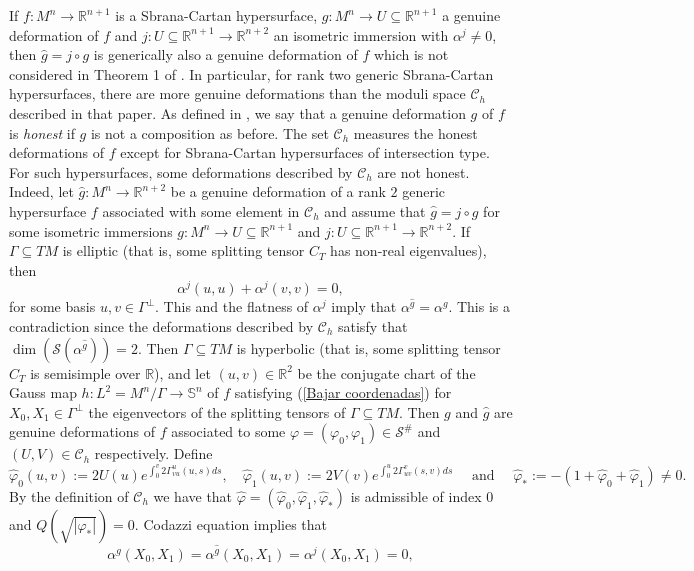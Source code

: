 \documentclass{article}
\theoremstyle{remark}
\begin{document}
If $f:M^n\rightarrow \mathbb{R}^{n+1}$ is a Sbrana-Cartan hypersurface, $g:M^n\rightarrow U\subseteq\mathbb{R}^{n+1}$ a genuine deformation of $f$ and $j:U\subseteq\mathbb{R}^{n+1}\rightarrow\mathbb{R}^{n+2}$ an isometric immersion with $\alpha^j\neq 0$, then $\hat{g}=j\circ g$ is generically also a genuine deformation of $f$ which is not considered in Theorem 1 of \cite{DFT}.
In particular, for rank two generic Sbrana-Cartan hypersurfaces, there are more genuine deformations than the moduli space $\mathcal{C}_h$ described in that paper. 
As defined in \cite{FF}, we say that a genuine deformation $g$ of $f$ is {\it honest} if $g$ is not a composition as before.
The set $\mathcal{C}_h$ measures the honest deformations of $f$ except for Sbrana-Cartan hypersurfaces of intersection type. For such hypersurfaces, some deformations described by $\mathcal{C}_h$ are not honest. 
Indeed, let $\hat{g}:M^{n}\rightarrow\mathbb{R}^{n+2}$ be a genuine deformation of a rank $2$ generic hypersurface $f$ associated with some element in $\mathcal{C}_h$ and assume that $\hat{g}=j\circ g$ for some isometric immersions $g:M^{n}\rightarrow U\subseteq\mathbb{R}^{n+1}$ and $j:U\subseteq\mathbb{R}^{n+1}\rightarrow\mathbb{R}^{n+2}$. If $\Gamma\subseteq TM$ is elliptic (that is, some splitting tensor $C_T$ has non-real eigenvalues), then
$$\alpha^j(u,u)+\alpha^j(v,v)=0,$$ 
for some basis $u,v\in\Gamma^\perp$. This and the flatness of $\alpha^j$ imply that $\alpha^{\hat{g}}=\alpha^g$. 
This is a contradiction since the deformations described by $\mathcal{C}_h$ satisfy that $\dim(\mathcal{S}(\alpha^{\hat{g}}))=2$.
Then $\Gamma\subseteq TM$ is hyperbolic (that is, some splitting tensor $C_T$ is semisimple over $\mathbb{R}$), and let $(u,v)\in\mathbb{R}^2$ be the conjugate chart of the Gauss map $h:L^2=M^n/\Gamma\rightarrow\mathbb{S}^n$ of $f$ satisfying (\ref{Bajar coordenadas}) for $X_0, X_1\in\Gamma^{\perp}$ the eigenvectors of the splitting tensors of $\Gamma\subseteq TM$. Then $g$ and ${\hat{g}}$ are genuine deformations of $f$ associated to some $\varphi=(\varphi_0,\varphi_1)\in\mathcal{S}^{\#}$ and $(U,V)\in\mathcal{C}_h$ respectively. Define
$$\hat{\varphi}_0(u,v):=2U(u)e^{\int_0^{v}2\Gamma_{vu}^{u}(u,s)ds},\quad\hat{\varphi}_1(u,v):=2V(v)e^{\int_0^{u}2\Gamma_{uv}^{v}(s,v)ds}\quad\text{ and }\quad\hat{\varphi}_{*}:=-(1+\hat{\varphi}_0+\hat{\varphi}_1)\neq0.$$ 
By the definition of $\mathcal{C}_h$ we have that  $\hat{\varphi}=(\hat{\varphi}_0,\hat{\varphi}_1,\hat{\varphi}_{*})$ is admissible of index $0$ and $Q(\sqrt{|\hat{\varphi}_{*}|})=0$. 
Codazzi equation implies that
$$\alpha^g(X_0,X_1)=\alpha^{\hat{g}}(X_0,X_1)=\alpha^j(X_0,X_1)=0,$$ 
\end{document}
